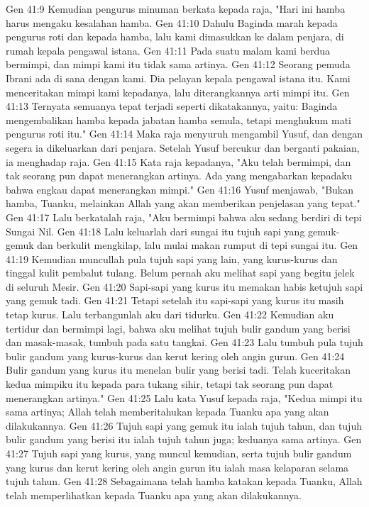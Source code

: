 Gen 41:9  Kemudian pengurus minuman berkata kepada raja, "Hari ini hamba harus mengaku kesalahan hamba.
Gen 41:10  Dahulu Baginda marah kepada pengurus roti dan kepada hamba, lalu kami dimasukkan ke dalam penjara, di rumah kepala pengawal istana.
Gen 41:11  Pada suatu malam kami berdua bermimpi, dan mimpi kami itu tidak sama artinya.
Gen 41:12  Seorang pemuda Ibrani ada di sana dengan kami. Dia pelayan kepala pengawal istana itu. Kami menceritakan mimpi kami kepadanya, lalu diterangkannya arti mimpi itu.
Gen 41:13  Ternyata semuanya tepat terjadi seperti dikatakannya, yaitu: Baginda mengembalikan hamba kepada jabatan hamba semula, tetapi menghukum mati pengurus roti itu."
Gen 41:14  Maka raja menyuruh mengambil Yusuf, dan dengan segera ia dikeluarkan dari penjara. Setelah Yusuf bercukur dan berganti pakaian, ia menghadap raja.
Gen 41:15  Kata raja kepadanya, "Aku telah bermimpi, dan tak seorang pun dapat menerangkan artinya. Ada yang mengabarkan kepadaku bahwa engkau dapat menerangkan mimpi."
Gen 41:16  Yusuf menjawab, "Bukan hamba, Tuanku, melainkan Allah yang akan memberikan penjelasan yang tepat."
Gen 41:17  Lalu berkatalah raja, "Aku bermimpi bahwa aku sedang berdiri di tepi Sungai Nil.
Gen 41:18  Lalu keluarlah dari sungai itu tujuh sapi yang gemuk-gemuk dan berkulit mengkilap, lalu mulai makan rumput di tepi sungai itu.
Gen 41:19  Kemudian muncullah pula tujuh sapi yang lain, yang kurus-kurus dan tinggal kulit pembalut tulang. Belum pernah aku melihat sapi yang begitu jelek di seluruh Mesir.
Gen 41:20  Sapi-sapi yang kurus itu memakan habis ketujuh sapi yang gemuk tadi.
Gen 41:21  Tetapi setelah itu sapi-sapi yang kurus itu masih tetap kurus. Lalu terbangunlah aku dari tidurku.
Gen 41:22  Kemudian aku tertidur dan bermimpi lagi, bahwa aku melihat tujuh bulir gandum yang berisi dan masak-masak, tumbuh pada satu tangkai.
Gen 41:23  Lalu tumbuh pula tujuh bulir gandum yang kurus-kurus dan kerut kering oleh angin gurun.
Gen 41:24  Bulir gandum yang kurus itu menelan bulir yang berisi tadi. Telah kuceritakan kedua mimpiku itu kepada para tukang sihir, tetapi tak seorang pun dapat menerangkan artinya."
Gen 41:25  Lalu kata Yusuf kepada raja, "Kedua mimpi itu sama artinya; Allah telah memberitahukan kepada Tuanku apa yang akan dilakukannya.
Gen 41:26  Tujuh sapi yang gemuk itu ialah tujuh tahun, dan tujuh bulir gandum yang berisi itu ialah tujuh tahun juga; keduanya sama artinya.
Gen 41:27  Tujuh sapi yang kurus, yang muncul kemudian, serta tujuh bulir gandum yang kurus dan kerut kering oleh angin gurun itu ialah masa kelaparan selama tujuh tahun.
Gen 41:28  Sebagaimana telah hamba katakan kepada Tuanku, Allah telah memperlihatkan kepada Tuanku apa yang akan dilakukannya.
